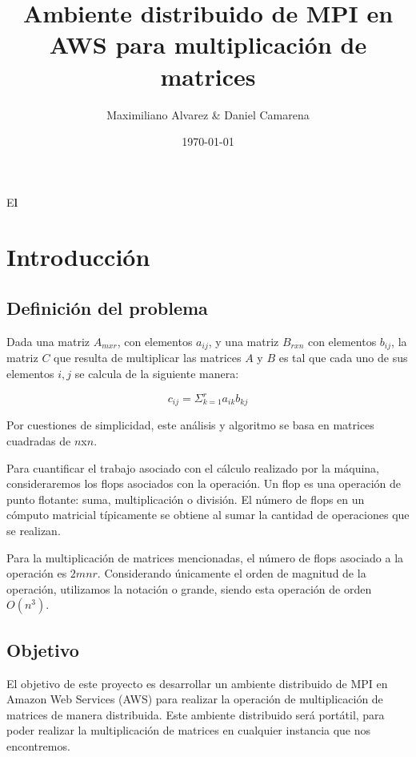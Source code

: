 \documentclass[DIV=calc, paper=letter, fontsize=11pt, twocolumn]{scrartcl}
\title{\Huge Ambiente distribuido de MPI en AWS para multiplicación de matrices}
\author{	Maximiliano Alvarez
			\& 
			Daniel Camarena }
\date{\today}
\newcommand{\initial}[1]{ 	
\lettrine[lines=3,lhang=0.3,nindent=0em]{
\color{DarkGoldenrod}
{\textsf{#1}}}{}}
\begin{document}
\maketitle

\thispagestyle{fancy}

\initial{E}\textbf{l }

\section{Introducción}

\subsection{Definición del problema}

Dada una matriz $A_{mxr}$, con elementos $a_{ij}$, y una matriz $B_{rxn}$ con elementos $b_{ij}$, la matriz $C$ que resulta de multiplicar las matrices $A$ y $B$ es tal que cada uno de sus elementos $i,j$ se calcula de la siguiente manera:

\begin{equation}
    c_{ij}=\Sigma_{k=1}^ra_{ik}b_{kj}
\end{equation}

Por cuestiones de simplicidad, este análisis y algoritmo se basa en matrices cuadradas de $n$x$n$.

Para cuantificar el trabajo asociado con el cálculo realizado por la máquina, consideraremos los flops asociados con la operación. Un flop es una operación de punto flotante: suma, multiplicación o división. El número de flops en un cómputo matricial típicamente se obtiene al sumar la cantidad de operaciones que se realizan.

Para la multiplicación de matrices mencionadas, el número de flops asociado a la operación es $2mnr$. Considerando únicamente el orden de magnitud de la operación, utilizamos la notación o grande, siendo esta operación de orden $O(n^3)$.

\subsection{Objetivo}

El objetivo de este proyecto es desarrollar un ambiente distribuido de MPI en Amazon Web Services (AWS) para realizar la operación de multiplicación de matrices de manera distribuida. Este ambiente distribuido será portátil, para poder realizar la multiplicación de matrices en cualquier instancia que nos encontremos.
\end{document}

